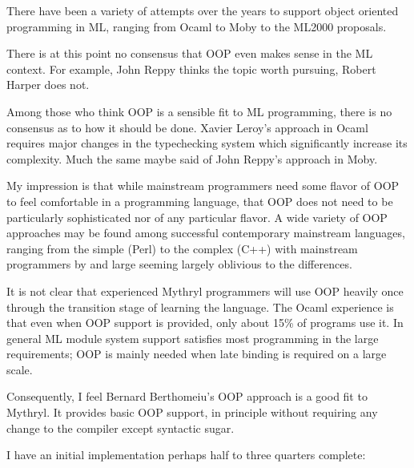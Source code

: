 There have been a variety of attempts over the years to support object 
oriented programming in ML, ranging from Ocaml to Moby to the ML2000 
proposals.

There is at this point no consensus that OOP even makes 
sense in the ML context.  For example, John Reppy thinks the topic 
worth pursuing, Robert Harper does not.

Among those who think OOP is a sensible fit to ML programming, there 
is no consensus as to how it should be done.  Xavier Leroy's approach 
in Ocaml requires major changes in the typechecking system which 
significantly increase its complexity.  Much the same maybe  said 
of John Reppy's approach in Moby.

My impression is that while mainstream programmers need some flavor 
of OOP to feel comfortable in a programming language, that OOP does 
not need to be particularly sophisticated nor of any particular 
flavor.  A wide variety of OOP approaches may be found among successful 
contemporary mainstream languages, ranging from the simple 
(Perl) to the complex (C++) with mainstream programmers by and large 
seeming largely oblivious to the differences.

It is not clear that experienced Mythryl programmers will use 
OOP heavily once through the transition stage of learning the 
language.  The Ocaml experience is that even when OOP support is 
provided, only about 15\% of programs use it.  In general ML 
module system support satisfies most programming in the large 
requirements;  OOP is mainly needed when late binding is 
required on a large scale.

Consequently, I feel Bernard Berthomeiu's OOP approach is a good fit 
to Mythryl.  It provides basic OOP support, in principle without 
requiring any change to the compiler except syntactic sugar.

I have an initial implementation perhaps half to three quarters complete: 

